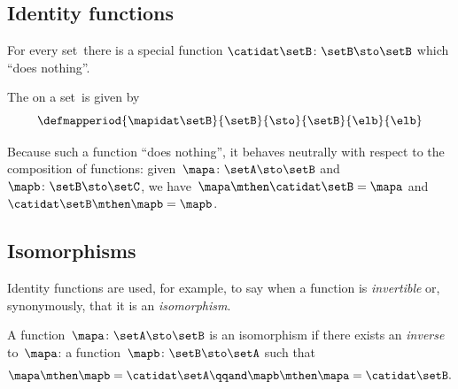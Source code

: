 \subsection{Identity functions}

For every set~\setB there is a special function $\catidat\setB \colon \setB \sto \setB$ which ``does nothing''.
\begin{ctdefinition}\label{def:identity-function}
    The  on a set~\setB is given by
    \begin{equation}
        \defmapperiod{
            \mapidat\setB
        }{
            \setB
        }{
            \sto
        }{
            \setB
        }{
            \elb
        }{
            \elb
        }
    \end{equation}
\end{ctdefinition}
Because such a function ``does nothing'', it behaves neutrally with respect to the composition of functions: given~$\mapa \colon \setA \sto \setB$ and~$\mapb \colon \setB \sto \setC$, we have~$\mapa \mthen \catidat\setB = \mapa$ and~$\catidat\setB \mthen \mapb = \mapb$.

\begin{marginfigure}
    \centering
    \caption{An identity function}
    \label{fig:identity-function}
\end{marginfigure}

\subsection{Isomorphisms}

Identity functions are used, for example, to say when a function is \emph{invertible} or, synonymously, that it is an \emph{isomorphism}.

\begin{ctdefinition}[Isomorphism]
    \label{def:function-isomorphism}
    A function~$\mapa \colon \setA \sto \setB$ is an isomorphism if there exists an \emph{inverse} to~$\mapa$: a function~$\mapb \colon \setB \sto \setA$ such that
    \begin{equation}
        \label{eq:isomorphism-equations}
        \mapa \mthen \mapb = \catidat\setA
        \qqand
        \mapb \mthen \mapa = \catidat\setB.
    \end{equation}
\end{ctdefinition}

